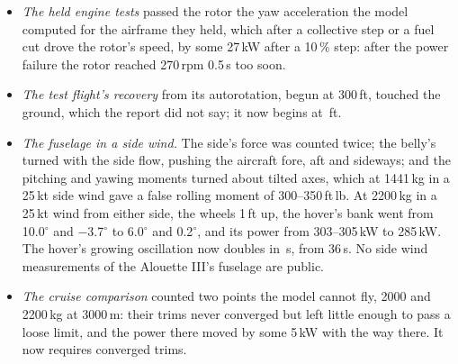 \documentclass[10pt,a4paper,twocolumn]{article}
\begin{document}
\begin{itemize}
\item \emph{The held engine tests} passed the rotor the yaw acceleration the model computed for the airframe they held, which after a
collective step or a fuel cut drove the rotor's speed, by some 27\,kW after a 10\,\% step: after the power failure the rotor reached
270\,rpm 0.5\,s too soon.
\item \emph{The test flight's recovery} from its autorotation, begun at 300\,ft, touched the ground, which the report did not say;
it now begins at \NMiRecoverFt\,ft.
\item \emph{The fuselage in a side wind.} The side's force was counted twice; the belly's turned with the side flow, pushing the aircraft
fore, aft and sideways; and the pitching and yawing moments turned about tilted axes, which at 1441\,kg in a 25\,kt side wind gave a false
rolling moment of 300--350\,ft\,lb. At 2200\,kg in a 25\,kt wind from either side, the wheels 1\,ft up, the hover's bank went from
10.0$^\circ$ and $-$3.7$^\circ$ to 6.0$^\circ$ and 0.2$^\circ$, and its power from 303--305\,kW to 285\,kW. The hover's growing
oscillation now doubles in \NModeOscDouble\,s, from 36\,s. No side wind measurements of the Alouette III's fuselage are public.
\item \emph{The cruise comparison} counted two points the model cannot fly, 2000 and 2200\,kg at 3000\,m: their trims never converged
but left little enough to pass a loose limit, and the power there moved by some 5\,kW with the way there. It now requires converged
trims.
\end{itemize}

\end{document}
